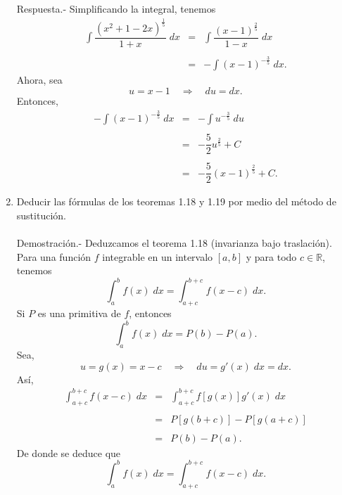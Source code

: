 \begin{enumerate}[\bfseries 1.]
	Respuesta.-\; Simplificando la integral, tenemos
	$$\begin{array}{rcl}
	    \displaystyle\int \dfrac{\left(x^2+1-2x\right)^{\frac{1}{5}}}{1+x}\; dx &=& \displaystyle\int \dfrac{(x-1)^{\frac{2}{5}}}{1-x}\; dx\\\\
										    &=&-\displaystyle\int (x-1)^{-\frac{3}{5}}\; dx.
	\end{array}$$
	Ahora, sea
	$$u=x-1\quad \Rightarrow \quad du=dx.$$
	Entonces,
	$$\begin{array}{rcl}
	    -\displaystyle\int (x-1)^{-\frac{3}{5}}\; dx &=& -\displaystyle\int u^{-\frac{3}{5}}\; du\\\\
	    										      &=&- \dfrac{5}{2}u^{\frac{2}{5}}+C\\\\
											      &=&- \dfrac{5}{2}\left(x-1\right)^{\frac{2}{5}}+C.
	\end{array}$$
	\vspace{.5cm}

    \item Deducir las fórmulas de los teoremas 1.18 y 1.19 por medio del método de sustitución.\\\\
	Demostración.-\; Deduzcamos el teorema 1.18 (invarianza bajo traslación). Para una función $f$ integrable en un intervalo $[a,b]$ y para todo $c\in \mathbb{R}$, tenemos
	$$\int_a^b f(x)\; dx = \int_{a+c}^{b+c}f(x-c)\; dx.$$
	Si $P$ es una primitiva de $f$, entonces
	$$\int_a^b f(x)\; dx = P(b)-P(a).$$
	Sea,
	$$u=g(x)=x-c\quad \Rightarrow \quad du=g'(x)\; dx = dx.$$
	Así,
	$$\begin{array}{rcl}
	    \displaystyle\int_{a+c}^{b+c} f(x-c)\; dx &=& \displaystyle\int_{a+c}^{b+c} f\left[g(x)\right]g'(x)\; dx\\\\
						      &=& P\left[g(b+c)\right]-P\left[g(a+c)\right]\\\\
						      &=& P(b)-P(a).
	\end{array}$$
	De donde se deduce que
	$$\int_a^b f(x)\; dx = \int_{a+c}^{b+c}f(x-c)\; dx.$$


\end{enumerate}
